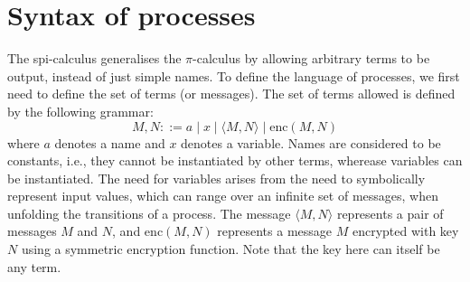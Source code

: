 \documentclass{article}
\begin{document}
\section{Syntax of processes}
\label{sec:syntax}

The spi-calculus generalises the $\pi$-calculus by allowing arbitrary terms to be output,
instead of just simple names. To define the language of processes, we first need to define
the set of terms (or messages). The set of terms allowed is defined by the following grammar:
$$
M, N  ::= a \mid x \mid \langle M, N \rangle \mid \mathrm{enc}(M, N)
$$
where $a$ denotes a name and $x$ denotes a variable. Names are considered to be constants,
i.e., they cannot be instantiated by other terms, wherease variables can be instantiated.
The need for variables arises from the need to symbolically represent input values, which
can range over an infinite set of messages, when 
unfolding the transitions of a process. The message $\langle M, N \rangle$ represents
a pair of messages $M$ and $N$, and $\mathrm{enc}(M,N)$ represents a message $M$ encrypted
with key $N$ using a symmetric encryption function. Note that the key here can itself be any term. 
\end{document}
